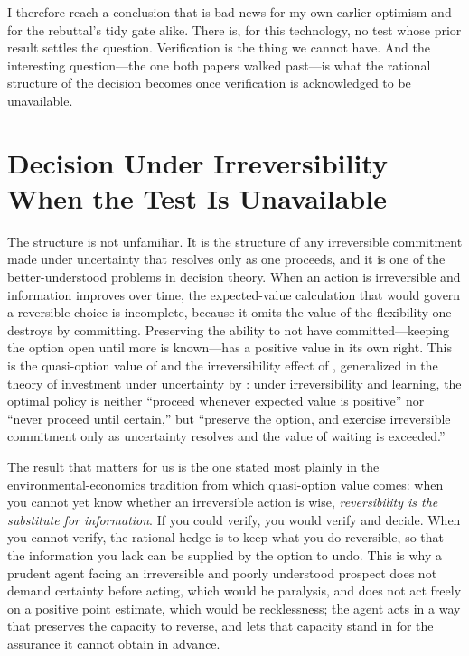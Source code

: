 \documentclass[11pt]{article}
\begin{document}
I therefore reach a conclusion that is bad news for my own earlier optimism and for the rebuttal's tidy gate alike. There is, for this technology, no test whose prior result settles the question. Verification is the thing we cannot have. And the interesting question---the one both papers walked past---is what the rational structure of the decision becomes once verification is acknowledged to be unavailable.

\section{Decision Under Irreversibility When the Test Is Unavailable}
\label{sec:decision}

The structure is not unfamiliar. It is the structure of any irreversible commitment made under uncertainty that resolves only as one proceeds, and it is one of the better-understood problems in decision theory. When an action is irreversible and information improves over time, the expected-value calculation that would govern a reversible choice is incomplete, because it omits the value of the flexibility one destroys by committing. Preserving the ability to not have committed---keeping the option open until more is known---has a positive value in its own right. This is the quasi-option value of \citet{arrowfisher1974} and the irreversibility effect of \citet{henry1974}, generalized in the theory of investment under uncertainty by \citet{dixitpindyck1994}: under irreversibility and learning, the optimal policy is neither ``proceed whenever expected value is positive'' nor ``never proceed until certain,'' but ``preserve the option, and exercise irreversible commitment only as uncertainty resolves and the value of waiting is exceeded.''

The result that matters for us is the one stated most plainly in the environmental-economics tradition from which quasi-option value comes: when you cannot yet know whether an irreversible action is wise, \emph{reversibility is the substitute for information}. If you could verify, you would verify and decide. When you cannot verify, the rational hedge is to keep what you do reversible, so that the information you lack can be supplied by the option to undo. This is why a prudent agent facing an irreversible and poorly understood prospect does not demand certainty before acting, which would be paralysis, and does not act freely on a positive point estimate, which would be recklessness; the agent acts in a way that preserves the capacity to reverse, and lets that capacity stand in for the assurance it cannot obtain in advance.
\end{document}
